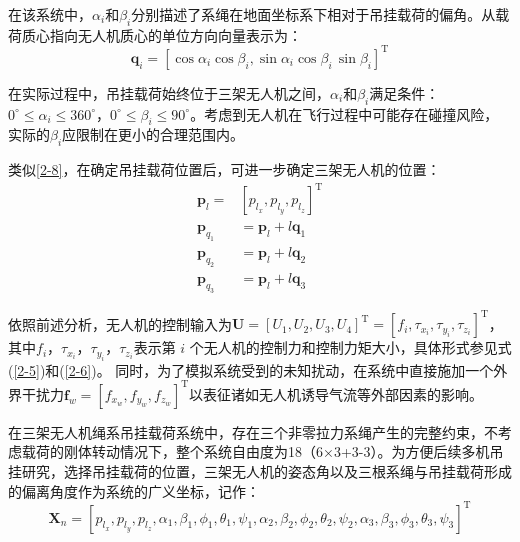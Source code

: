 \documentclass[lang=chs, degree=master, blindreview=false, winfonts=true]{yanputhesis}
\begin{document}
在该系统中，$\alpha_{i}$和$\beta_i$分别描述了系绳在地面坐标系下相对于吊挂载荷的偏角。从载荷质心指向无人机质心的单位方向向量表示为：
\begin{equation}
	\boldsymbol{q}_i=\left[\cos\alpha_i\cos\beta_i,\sin\alpha_i\cos\beta_i\,\sin\beta_i\right]^\mathrm T
\end{equation}

在实际过程中，吊挂载荷始终位于三架无人机之间，$\alpha_{i}$和$\beta_i$满足条件：
$0^\circ\leq\alpha_i\leq360^\circ$，$0^\circ\leq\beta_i\leq90^\circ$。考虑到无人机在飞行过程中可能存在碰撞风险，实际的$\beta_i$应限制在更小的合理范围内。

类似\autoref{2-8}，在确定吊挂载荷位置后，可进一步确定三架无人机的位置：
\begin{equation}
\begin{aligned}
	\boldsymbol{p}_{l}=&\left[p_{l_{x}},p_{l_{y}},p_{l_{z}}\right]^{\mathrm{T}} \\
	\boldsymbol{p}_{q_1}&=\boldsymbol{p}_l+l\boldsymbol{q}_1 \\
	\boldsymbol{p}_{q_2}&=\boldsymbol{p}_{l}+l\boldsymbol{q}_{2} \\
	\boldsymbol{p}_{q_3}&=\boldsymbol{p}_l+l\boldsymbol{q}_3
\end{aligned}
\end{equation}

依照前述分析，无人机的控制输入为$\bm{U}=\left[U_1,U_2,U_3,U_4\right]^\mathrm{T}=\left[f_i,\tau_{x_i},\tau_{y_i},\tau_{z_i}\right]^\mathrm{T}$，其中$f_{i}$，$\tau_{x_i}$，$\tau_{y_i}$，$\tau_{z_i}$表示第 $i$ 个无人机的控制力和控制力矩大小，具体形式参见式(\ref{2-5})和(\ref{2-6})。
同时，为了模拟系统受到的未知扰动，在系统中直接施加一个外界干扰力$\bm f_w=\left[f_{x_w},f_{y_w},f_{z_w}\right]^\mathrm{T}$以表征诸如无人机诱导气流等外部因素的影响。

在三架无人机绳系吊挂载荷系统中，存在三个非零拉力系绳产生的完整约束，不考虑载荷的刚体转动情况下，整个系统自由度为18（6×3+3-3）。为方便后续多机吊挂研究，选择吊挂载荷的位置，三架无人机的姿态角以及三根系绳与吊挂载荷形成的偏离角度作为系统的广义坐标，记作：
\begin{equation}
	\boldsymbol{X}_n=\left[
	p_{l_x} , p_{l_y} , p_{l_z},\alpha_1,\beta_1,\phi_1,\theta_1,\psi_1,\alpha_2,\beta_2,\phi_2,\theta_2,\psi_2,\alpha_3,\beta_3,\phi_3,\theta_3,\psi_3
	\right]^\mathrm T
\end{equation}
\end{document}
